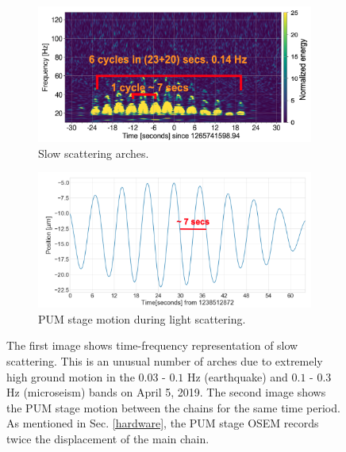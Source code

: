 \documentclass[12pt]{iopart}
\begin{document}
\begin{figure}[h]
\captionsetup[subfigure]{font=scriptsize,labelfont=scriptsize}
   \centering
    \begin{subfigure}[b]{0.45\textwidth}
        \centering
         \includegraphics[width= \textwidth]{slow_arch2.png}
         \caption{Slow scattering arches.}
         \label{fig:slowscat}
    \end{subfigure}
    \hfill
    \begin{subfigure}[b]{0.45\textwidth}
        \centering
         \includegraphics[width =\textwidth]{ts_sus2.png}
         \caption{PUM stage motion during light scattering.}
         \label{fig:timeseriessus}
         
    
    \end{subfigure}
    \caption{The first image shows time-frequency representation of  slow scattering. This is an unusual number of arches due to extremely high ground motion in the $0.03$ - $0.1$ Hz (earthquake) and $0.1$ - $0.3$  Hz (microseism) bands on April 5, 2019. The second image shows the PUM stage motion between the chains for the same time period. As mentioned in Sec. \ref{hardware}, the PUM stage OSEM records twice the displacement of the main chain.}
    \label{fig:slowscat_sus}
    
\end{figure}
\end{document}
